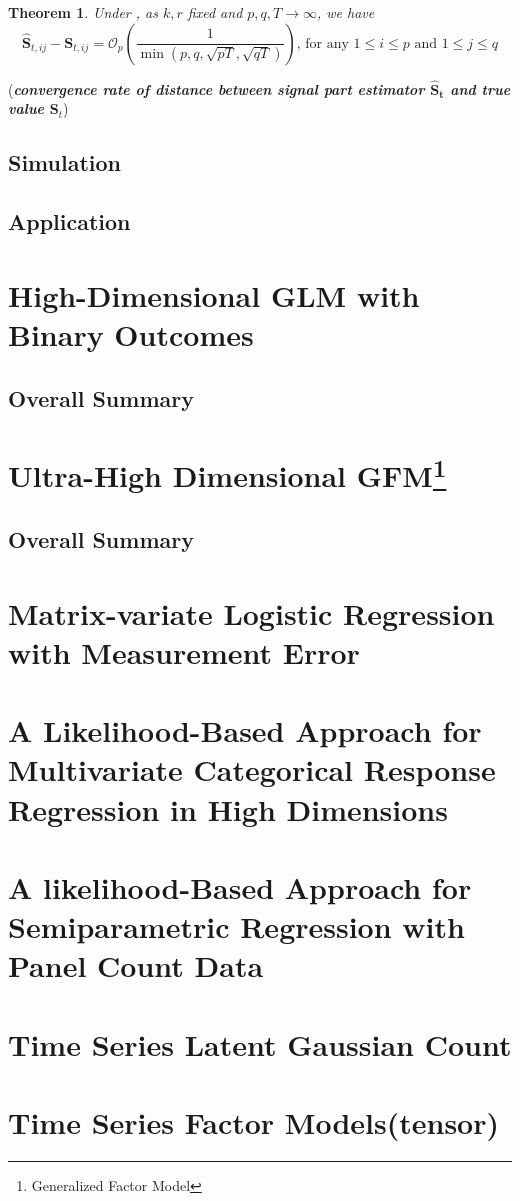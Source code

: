 \documentclass{article}[12pt]
\newtheorem{theorem}{Theorem}
\begin{document}
\begin{theorem}
    \normalfont Under  , as $k,r$ fixed and $p,q,T \rightarrow \infty$, we have 
    $$
    \mathbf{\widehat{S}}_{t,ij}-\mathbf{S}_{t,ij}= \mathcal{O}_p\left(\dfrac{1}{\min\left(p,q,\sqrt{pT},\sqrt{qT}\right)}\right) \text{, for any } 1 \leq i \leq p \text{ and } 1 \leq j \leq q
    $$
\end{theorem}
\noindent (\textbf{\textit{convergence rate of distance between signal part estimator $\mathbf{\widehat{S}_t}$ and true value $\mathbf{S}_t$}})

\subsection{Simulation}

\subsection{Application}

\section{High-Dimensional GLM with Binary Outcomes}

\subsection{Overall Summary}

\section [Ultra-High Dimensional GFM]{Ultra-High Dimensional GFM\footnote{Generalized Factor Model}} 

\subsection{Overall Summary} 

\section{Matrix-variate Logistic Regression with Measurement Error}

\section{A Likelihood-Based Approach for Multivariate Categorical Response Regression in High Dimensions}

\section{A likelihood-Based Approach for Semiparametric Regression with Panel Count Data}

\section{Time Series Latent Gaussian Count}

\section{Time Series Factor Models(tensor)}   
\end{document}
